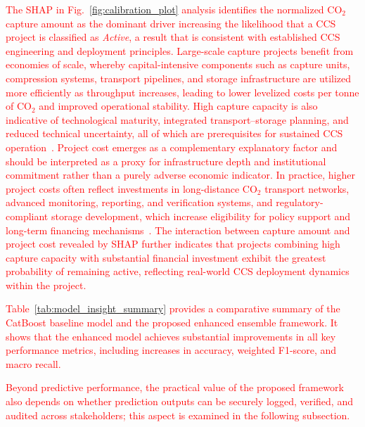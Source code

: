 \documentclass[conference]{IEEEtran}
\begin{document}
\textcolor{red}{The SHAP in Fig.~\ref{fig:calibration_plot} analysis identifies the normalized CO$_2$ capture amount as the dominant driver increasing the likelihood that a CCS project is classified as \emph{Active}, a result that is consistent with established CCS engineering and deployment principles. Large-scale capture projects benefit from economies of scale, whereby capital-intensive components such as capture units, compression systems, transport pipelines, and storage infrastructure are utilized more efficiently as throughput increases, leading to lower levelized costs per tonne of CO$_2$ and improved operational stability. High capture capacity is also indicative of technological maturity, integrated transport--storage planning, and reduced technical uncertainty, all of which are prerequisites for sustained CCS operation~\cite{mclaughlin2023carbon}. Project cost emerges as a complementary explanatory factor and should be interpreted as a proxy for infrastructure depth and institutional commitment rather than a purely adverse economic indicator. In practice, higher project costs often reflect investments in long-distance CO$_2$ transport networks, advanced monitoring, reporting, and verification systems, and regulatory-compliant storage development, which increase eligibility for policy support and long-term financing mechanisms~\cite{priya2023artificial}. The interaction between capture amount and project cost revealed by SHAP further indicates that projects combining high capture capacity with substantial financial investment exhibit the greatest probability of remaining active, reflecting real-world CCS deployment dynamics within the project.



Table~\ref{tab:model_insight_summary} provides a comparative summary of the CatBoost baseline model and the proposed enhanced ensemble framework. It shows that the enhanced model achieves substantial improvements in all key performance metrics, including increases in accuracy, weighted F1-score, and macro recall. 

Beyond predictive performance, the practical value of the proposed framework also depends on whether prediction outputs can be securely logged, verified, and audited across stakeholders; this aspect is examined in the following subsection.


}
\end{document}
